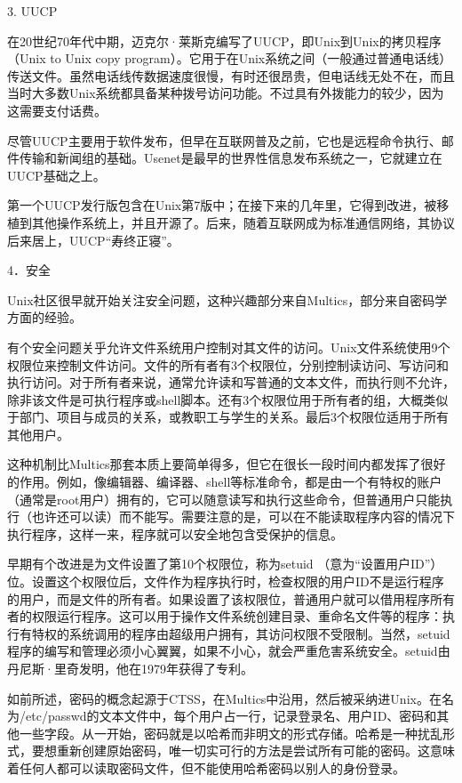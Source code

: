 \documentclass[a4paper,12pt,UTF8,twoside]{ctexbook}
\begin{document}
3. UUCP


在20世纪70年代中期，迈克尔·莱斯克编写了UUCP，即Unix到Unix的拷贝程序（Unix to Unix copy program）。它用于在Unix系统之间（一般通过普通电话线）传送文件。虽然电话线传数据速度很慢，有时还很昂贵，但电话线无处不在，而且当时大多数Unix系统都具备某种拨号访问功能。不过具有外拨能力的较少，因为这需要支付话费。

尽管UUCP主要用于软件发布，但早在互联网普及之前，它也是远程命令执行、邮件传输和新闻组的基础。Usenet是最早的世界性信息发布系统之一，它就建立在UUCP基础之上。

第一个UUCP发行版包含在Unix第7版中；在接下来的几年里，它得到改进，被移植到其他操作系统上，并且开源了。后来，随着互联网成为标准通信网络，其协议后来居上，UUCP“寿终正寝”。





4．安全


Unix社区很早就开始关注安全问题，这种兴趣部分来自Multics，部分来自密码学方面的经验。

有个安全问题关乎允许文件系统用户控制对其文件的访问。Unix文件系统使用9个权限位来控制文件访问。文件的所有者有3个权限位，分别控制读访问、写访问和执行访问。对于所有者来说，通常允许读和写普通的文本文件，而执行则不允许，除非该文件是可执行程序或shell脚本。还有3个权限位用于所有者的组，大概类似于部门、项目与成员的关系，或教职工与学生的关系。最后3个权限位适用于所有其他用户。

这种机制比Multics那套本质上要简单得多，但它在很长一段时间内都发挥了很好的作用。例如，像编辑器、编译器、shell等标准命令，都是由一个有特权的账户（通常是root用户）拥有的，它可以随意读写和执行这些命令，但普通用户只能执行（也许还可以读）而不能写。需要注意的是，可以在不能读取程序内容的情况下执行程序，这样一来，程序就可以安全地包含受保护的信息。

早期有个改进是为文件设置了第10个权限位，称为setuid （意为“设置用户ID”）位。设置这个权限位后，文件作为程序执行时，检查权限的用户ID不是运行程序的用户，而是文件的所有者。如果设置了该权限位，普通用户就可以借用程序所有者的权限运行程序。这可以用于操作文件系统创建目录、重命名文件等的程序：执行有特权的系统调用的程序由超级用户拥有，其访问权限不受限制。当然，setuid程序的编写和管理必须小心翼翼，如果不小心，就会严重危害系统安全。setuid由丹尼斯·里奇发明，他在1979年获得了专利。

如前所述，密码的概念起源于CTSS，在Multics中沿用，然后被采纳进Unix。在名为/etc/passwd的文本文件中，每个用户占一行，记录登录名、用户ID、密码和其他一些字段。从一开始，密码就是以哈希而非明文的形式存储。哈希是一种扰乱形式，要想重新创建原始密码，唯一切实可行的方法是尝试所有可能的密码。这意味着任何人都可以读取密码文件，但不能使用哈希密码以别人的身份登录。
\end{document}
